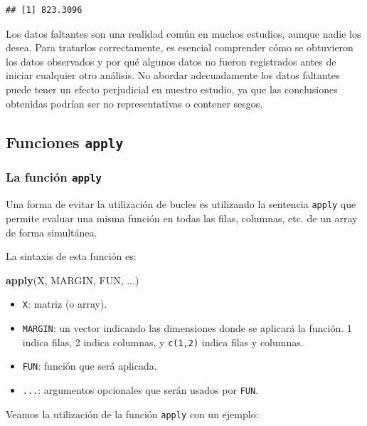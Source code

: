 \documentclass[
]{book}
\newenvironment{Shaded}{\begin{snugshade}}{\end{snugshade}}
\newcommand{\FunctionTok}[1]{\textcolor[rgb]{0.13,0.29,0.53}{\textbf{#1}}}
\newcommand{\NormalTok}[1]{#1}
\providecommand{\tightlist}{%
  \setlength{\itemsep}{0pt}\setlength{\parskip}{0pt}}
\theoremstyle{break}
\theoremstyle{nonumberplain}
\begin{document}
\begin{verbatim}
## [1] 823.3096
\end{verbatim}

Los datos faltantes son una realidad común en muchos estudios, aunque nadie los desea. Para tratarlos correctamente, es esencial comprender cómo se obtuvieron los datos observados y por qué algunos datos no fueron registrados antes de iniciar cualquier otro análisis. No abordar adecuadamente los datos faltantes puede tener un efecto perjudicial en nuestro estudio, ya que las conclusiones obtenidas podrían ser no representativas o contener sesgos.

\subsection{\texorpdfstring{Funciones \texttt{apply}}{Funciones apply}}\label{funciones-apply}

\subsubsection{\texorpdfstring{La función \texttt{apply}}{La función apply}}\label{la-funciuxf3n-apply}

Una forma de evitar la utilización de bucles es utilizando la sentencia \texttt{apply} que permite evaluar una misma función en todas las filas, columnas, etc. de un array de forma simultánea.

La sintaxis de esta función es:

\begin{Shaded}
\begin{Highlighting}[]
\FunctionTok{apply}\NormalTok{(X, MARGIN, FUN, ...)}
\end{Highlighting}
\end{Shaded}

\begin{itemize}
\tightlist
\item
  \texttt{X}: matriz (o array).
\item
  \texttt{MARGIN}: un vector indicando las dimensiones donde se aplicará
  la función. 1 indica filas, 2 indica columnas, y \texttt{c(1,2)} indica
  filas y columnas.
\item
  \texttt{FUN}: función que será aplicada.
\item
  \texttt{...}: argumentos opcionales que serán usados por \texttt{FUN}.
\end{itemize}

Veamos la utilización de la función \texttt{apply} con un ejemplo:
\end{document}
